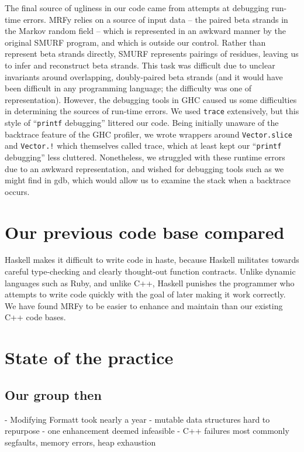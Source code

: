 \documentclass[preprint]{sigplanconf}
\begin{document}
The final source of ugliness in our code came from attempts at debugging 
run-time errors. MRFy relies on a source of input data -- the paired beta 
strands in the Markov random field -- which is represented in an awkward manner 
by the original SMURF program, and which is outside our control. Rather than 
represent beta strands directly, SMURF represents pairings of residues, leaving 
us to infer and reconstruct beta strands. This task was difficult due to 
unclear invariants around overlapping, doubly-paired beta strands (and it would 
have been difficult in any programming language; the difficulty was one of 
representation). However, the debugging tools in GHC caused us some 
difficulties in determining the sources of run-time errors. We used 
\texttt{trace} extensively, but this style of ``\texttt{printf} debugging'' 
littered our code. Being initially unaware of the backtrace feature of the GHC 
profiler, we wrote wrappers around \texttt{Vector.slice} and \texttt{Vector.!} 
which themselves called trace, which at least kept our ``\texttt{printf} 
debugging'' less cluttered. Nonetheless, we struggled with these runtime errors 
due to an awkward representation, and wished for debugging tools such as we 
might find in gdb, which would allow us to examine the stack when a backtrace 
occurs.
 
 
\section{Our previous code base compared}

Haskell makes it difficult to write code in haste, because Haskell militates towards careful type-checking and clearly thought-out function contracts. Unlike dynamic languages such as Ruby, and unlike C++, Haskell punishes the programmer who attempts to write code quickly with the goal of later making it work correctly. We have found MRFy to be easier to enhance and maintain than our existing C++ code bases.
 
\section{State of the practice}

\subsection{Our group then}
 - Modifying Formatt took nearly a year
 - mutable data structures hard to repurpose
 - one enhancement deemed infeasible
 - C++ failures most commonly segfaults, memory errors, heap exhaustion
\end{document}
